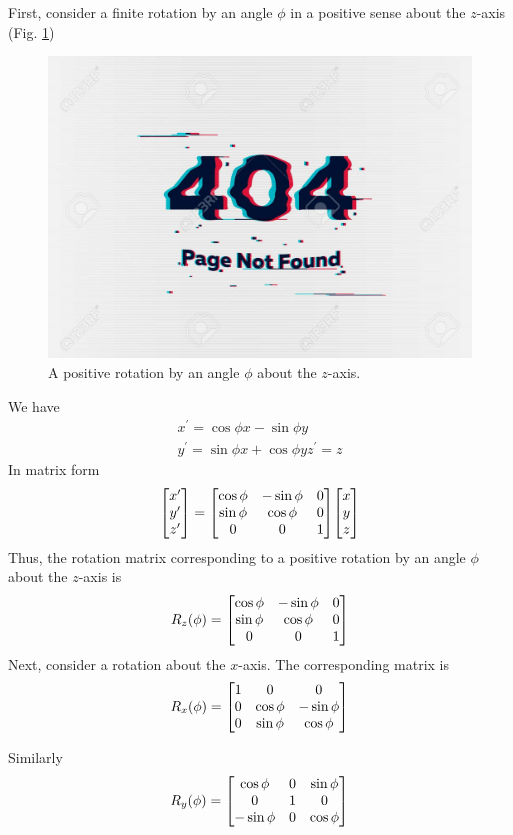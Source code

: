 First, consider a finite rotation by an angle $\phi$ in a positive sense about the $z$-axis (Fig. \ref{chapter18.fig2})
\begin{figure}
	\centering
	\includegraphics[width=0.5\linewidth]{Pictures/not-found.jpg}
	\caption{A positive rotation by an angle $\phi$ about the $z$-axis.}
	\label{chapter18.fig2}
\end{figure}
We have
\begin{align*}
x^\prime = \cos\phi x - \sin\phi y \\
y^\prime = \sin\phi x + \cos\phi y
z^\prime = z
\end{align*}
In matrix form
\begin{equation*}
	\mqty[x^\prime\\ y^\prime \\ z^\prime] = \mqty[\cos\phi & - \sin\phi& 0 \\
		\sin\phi & \cos\phi & 0 \\
		0& 0& 1]  
	\mqty[x\\ y \\ z]
\end{equation*}
Thus, the rotation matrix corresponding to a positive rotation by an angle $\phi$ about the $z$-axis is 
\begin{equation}
\label{chapter18.eqn4}
R_z\qty(\phi) = \mqty[\cos\phi & - \sin\phi& 0 \\
\sin\phi & \cos\phi& 0 \\
0& 0& 1]
\end{equation}
Next, consider a rotation about the $x$-axis. The corresponding matrix is
\begin{equation}
\label{chapter18.eqn5}
R_x\qty(\phi) = \mqty[1& 0& 0 \\
0& \cos\phi & - \sin\phi\\
0& \sin\phi & \cos\phi]
\end{equation}

Similarly
\begin{equation}
\label{chapter18.eqn6}
R_y\qty(\phi) = \mqty[\cos\phi& 0& \sin\phi \\
0& 1& 0 \\
-\sin\phi& 0 &\cos\phi]
\end{equation}

